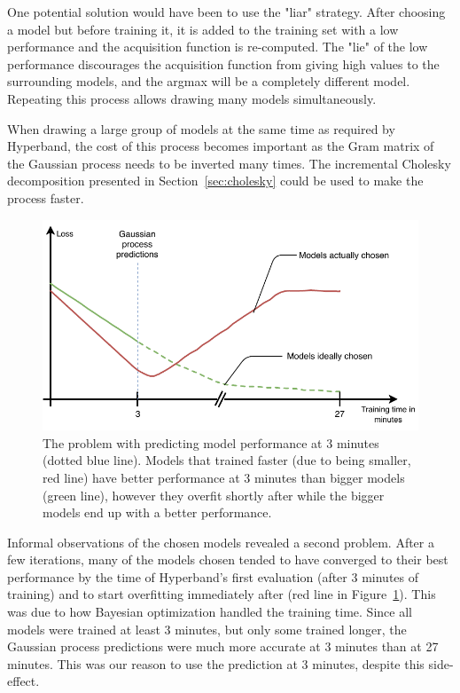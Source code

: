 One potential solution would have been to use the "liar" strategy. After choosing a model but before training it, it is added to the training set with a low performance and the acquisition function is re-computed. The "lie" of the low performance discourages the acquisition function from giving high values to the surrounding models, and the argmax will be a completely different model. Repeating this process allows drawing many models simultaneously. 

When drawing a large group of models at the same time as required by Hyperband, the cost of this process becomes important as the Gram matrix of the Gaussian process needs to be inverted many times. The incremental Cholesky decomposition presented in Section~\ref{sec:cholesky} could be used to make the process faster.

\begin{figure}[htbp]
	\centering
	\includegraphics[width=\linewidth]{img_hyperopt/combine_overfit}
	\caption[Why predicting model performance at 3 minutes lead to overfitting]{The problem with predicting model performance at 3 minutes (dotted blue line). Models that trained faster (due to being smaller, red line) have better performance at 3 minutes than bigger models (green line), however they overfit shortly after while the bigger models end up with a better performance.}
	\label{fig:combine_overfit}
\end{figure}

Informal observations of the chosen models revealed a second problem. After a few iterations, many of the models chosen tended to have converged to their best performance by the time of Hyperband's first evaluation (after 3 minutes of training) and to start overfitting immediately after (red line in Figure~\ref{fig:combine_overfit}). This was due to how Bayesian optimization handled the training time. Since all models were trained at least 3 minutes, but only some trained longer, the Gaussian process predictions were much more accurate at 3 minutes than at 27 minutes. This was our reason to use the prediction at 3 minutes, despite this side-effect.


